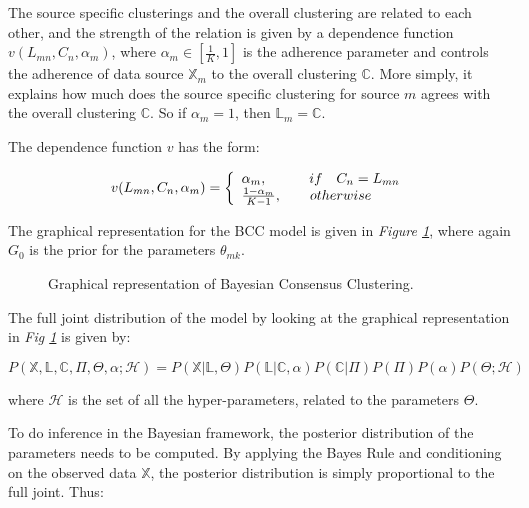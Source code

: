 The source specific clusterings and the overall clustering are related to each other, and the strength of the relation is given by a dependence function $v(L_{mn}, C_{n}, \alpha_{m})$, where $\alpha_{m} \in [\frac{1}{K}, 1]$ is the adherence parameter and controls the adherence of data source $\mathbb{X}_m$ to the overall clustering $\mathbb{C}$. More simply, it explains how much does the source specific clustering for source $m$ agrees with the overall clustering $\mathbb{C}$. So if $\alpha_{m} = 1$, then $\mathbb{L}_{m} = \mathbb{C}$. 

The dependence function $v$ has the form:

\begin{equation}
	v(L_{mn}, C_{n}, \alpha_{m}) = \left\{
	\begin{array}{l l}
		\alpha_{m},\quad \quad \quad if\quad C_{n} = L_{mn}\\
		\frac{1-\alpha_{m}}{K-1},\quad \quad otherwise
	\end{array}\right.
\end{equation}

The graphical representation for the BCC model is given in \emph{Figure \ref{bcc-pic}}, where again $G_{0}$ is the prior for the parameters $\theta_{mk}$.

\begin{figure}[ht]
  \begin{center}
      
  \caption{Graphical representation of Bayesian Consensus Clustering.}
  \label{bcc-pic}
  \end{center}
\end{figure}

The full joint distribution of the model by looking at the graphical representation in \emph{Fig \ref{bcc-pic}} is given by:

\begin{equation}\scriptstyle
	P(\mathbb{X}, \mathbb{L}, \mathbb{C}, \Pi , \Theta , \alpha ; \mathcal{H}) = P(\mathbb{X}|\mathbb{L},\Theta) P(\mathbb{L}|\mathbb{C},\alpha) P(\mathbb{C}|\Pi) P(\Pi) P(\alpha) P(\Theta ; \mathcal{H})
\end{equation}

where $\mathcal{H}$ is the set of all the hyper-parameters, related to the parameters $\Theta$. 

To do inference in the Bayesian framework, the posterior distribution of the parameters needs to be computed. By applying the Bayes Rule and conditioning on the observed data $\mathbb{X}$, the posterior distribution is simply proportional to the full joint. Thus:
 

